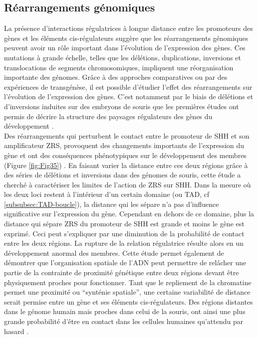 \subsection{Réarrangements génomiques}
\label{subsec:rearrangement}

La présence d’interactions régulatrices à longue distance entre les promoteurs des gènes et les éléments \gls{cis}-régulateurs suggère que les réarrangements génomiques peuvent avoir un rôle important dans l’évolution de l’expression des gènes. Ces mutations à grande échelle, telles que les délétions, duplications, inversions et translocations de segments chromosomiques, impliquent une réorganisation importante des génomes. Grâce à des approches comparatives ou par des expériences de transgénèse, il est possible d’étudier l’effet des réarrangements sur l’évolution de l’expression des gènes. C’est notamment par le biais de délétions et d’inversions induites sur des embryons de souris que les premières études ont permis de décrire la structure des paysages régulateurs des gènes du développement \citep{tschopp_genetic_2011}. \\

Des réarrangements qui perturbent le contact entre le promoteur de \acrshort{SHH} et son \gls{amplificateur} \acrshort{ZRS}, provoquent des changements importants de l’expression du gène et ont des conséquences phénotypiques sur le développement des membres (Figure \ref{fig:Fig35}) \citep{symmons_SHH_2016}. En faisant varier la distance entre ces deux régions grâce à des séries de délétions et inversions dans des génomes de souris, cette étude a cherché à caractériser les limites de l’action de \acrshort{ZRS} sur \acrshort{SHH}. Dans la mesure où les deux loci restent à l’intérieur d’un certain domaine (ou \acrshort{TAD}, cf \ref{subsubsec:TAD-boucle}), la distance qui les sépare n’a pas d’influence significative sur l’expression du gène. Cependant en dehors de ce domaine, plus la distance qui sépare \acrshort{ZRS} du promoteur de \acrshort{SHH} est grande et moins le gène est exprimé. Ceci peut s’expliquer par une diminution de la probabilité de contact entre les deux régions. La rupture de la relation régulatrice résulte alors en un développement anormal des membres. Cette étude permet également de démontrer que l’organisation spatiale de l’ADN peut permettre de relâcher une partie de la contrainte de proximité génétique entre deux régions devant être physiquement proches pour fonctionner. Tant que le repliement de la chromatine permet une proximité ou “synténie spatiale”, une certaine variabilité de distance serait permise entre un gène et ses éléments \gls{cis}-régulateurs. Des régions distantes dans le génome humain mais proches dans celui de la souris, ont ainsi une plus grande probabilité d’être en contact dans les cellules humaines qu’attendu par hasard \citep{veron_close_2011}.

